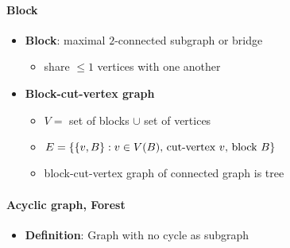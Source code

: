 \paragraph{Block}
\begin{itemize}
  \item \textbf{Block}: maximal $ 2 $-connected subgraph or bridge
  \begin{itemize}
     \item share $ \leq 1 $ vertices with one another 
   \end{itemize} 
   \item \textbf{Block-cut-vertex graph}
   \begin{itemize}
     \item $ V = $ set of blocks $ \cup $ set of vertices
     \item $ E = \{ \{ v,B \} : v \in V(B) \text{, cut-vertex $ v $, block $ B $} \} $ 
     \item block-cut-vertex graph of connected graph is tree
   \end{itemize}
\end{itemize}

\paragraph{Acyclic graph, Forest}
\begin{itemize}
  \item \textbf{Definition}: Graph with no cycle as subgraph
\end{itemize}

